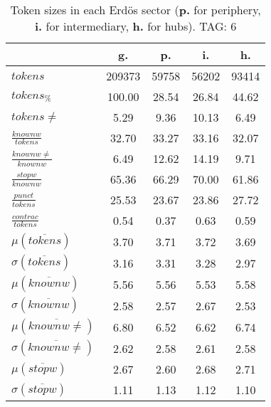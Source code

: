 \begin{table}[h!]
\begin{center}
\begin{tabular}{| l || c | c | c | c |}\hline
 & {\bf g.} & {\bf p.} & {\bf i.} & {\bf h.} \\\hline\hline
$tokens$ & 209373  & 59758  & 56202  & 93414 \\
$tokens_{\%}$ & 100.00  & 28.54  & 26.84  & 44.62 \\
$tokens \neq$ & 5.29  & 9.36  & 10.13  & 6.49 \\\hline
$\frac{knownw}{tokens}$ & 32.70  & 33.27  & 33.16  & 32.07 \\
$\frac{knownw \neq}{knownw}$ & 6.49  & 12.62  & 14.19  & 9.71 \\\hline
$\frac{stopw}{knownw}$ & 65.36  & 66.29  & 70.00  & 61.86 \\
$\frac{punct}{tokens}$ & 25.53  & 23.67  & 23.86  & 27.72 \\
$\frac{contrac}{tokens}$ & 0.54  & 0.37  & 0.63  & 0.59 \\\hline\hline
$\mu(\overline{tokens})$ & 3.70  & 3.71  & 3.72  & 3.69 \\
$\sigma(\overline{tokens})$ & 3.16  & 3.31  & 3.28  & 2.97 \\\hline
$\mu(\overline{knownw})$ & 5.56  & 5.56  & 5.53  & 5.58 \\
$\sigma(\overline{knownw})$ & 2.58  & 2.57  & 2.67  & 2.53 \\\hline
$\mu(\overline{knownw \neq})$ & 6.80  & 6.52  & 6.62  & 6.74 \\
$\sigma(\overline{knownw \neq})$ & 2.62  & 2.58  & 2.61  & 2.58 \\\hline
$\mu(\overline{stopw})$ & 2.67  & 2.60  & 2.68  & 2.71 \\
$\sigma(\overline{stopw})$ & 1.11  & 1.13  & 1.12  & 1.10 \\\hline
\end{tabular}
\caption{Token sizes in each Erd\"os sector ({{\bf p.}} for periphery, {{\bf i.}} for intermediary, {{\bf h.}} for hubs). TAG: 6}
\end{center}
\end{table}